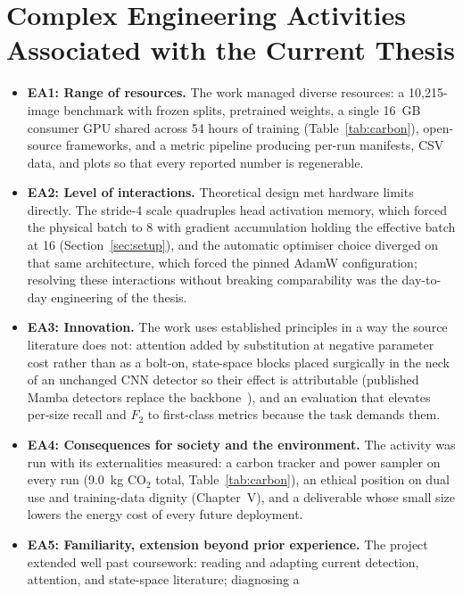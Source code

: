 \section{Complex Engineering Activities Associated with the Current Thesis}
\begin{itemize}
  \item \textbf{EA1: Range of resources.} The work managed diverse
        resources: a 10{,}215-image benchmark with frozen splits, pretrained
        weights, a single 16~GB consumer GPU shared across 54 hours of
        training (Table~\ref{tab:carbon}), open-source frameworks, and a
        metric pipeline producing per-run manifests, CSV data, and plots so
        that every reported number is regenerable.
  \item \textbf{EA2: Level of interactions.} Theoretical design met hardware
        limits directly. The stride-4 scale quadruples head activation
        memory, which forced the physical batch to 8 with gradient
        accumulation holding the effective batch at 16 (Section~\ref{sec:setup}), and
        the automatic optimiser choice diverged on that same architecture,
        which forced the pinned AdamW configuration; resolving these
        interactions without breaking comparability was the day-to-day
        engineering of the thesis.
  \item \textbf{EA3: Innovation.} The work uses established principles in a
        way the source literature does not: attention added by substitution
        at negative parameter cost rather than as a bolt-on, state-space
        blocks placed surgically in the neck of an unchanged CNN detector so
        their effect is attributable (published Mamba detectors replace the
        backbone~\cite{wang2025mambayolo}), and an evaluation that elevates
        per-size recall and $F_2$ to first-class metrics because the task
        demands them.
  \item \textbf{EA4: Consequences for society and the environment.} The
        activity was run with its externalities measured: a carbon tracker
        and power sampler on every run (9.0~kg CO$_2$ total,
        Table~\ref{tab:carbon}), an ethical position on dual use and
        training-data dignity (Chapter~V), and a deliverable whose small
        size lowers the energy cost of every future deployment.
  \item \textbf{EA5: Familiarity, extension beyond prior experience.} The
        project extended well past coursework: reading and adapting current
        detection, attention, and state-space literature; diagnosing a

\end{itemize}
